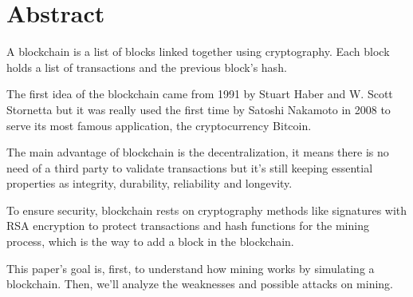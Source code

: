 \section{Abstract}

A blockchain is a list of blocks linked together using cryptography. Each block holds a list of transactions and the previous block's hash.

The first idea of the blockchain came from 1991 by Stuart Haber and W. Scott Stornetta but it was really used the first time by Satoshi Nakamoto in 2008 to serve its most famous application, the cryptocurrency Bitcoin. \newline

The main advantage of blockchain is the decentralization, it means there is no need of a third party to validate transactions but it's still keeping essential properties as integrity, durability, reliability and longevity. \newline

To ensure security, blockchain rests on cryptography methods like signatures with RSA encryption to protect transactions and hash functions for the mining process, which is the way to add a block in the blockchain.

This paper's goal is, first, to understand how mining works by simulating a blockchain. Then, we'll analyze the weaknesses and possible attacks on mining.
